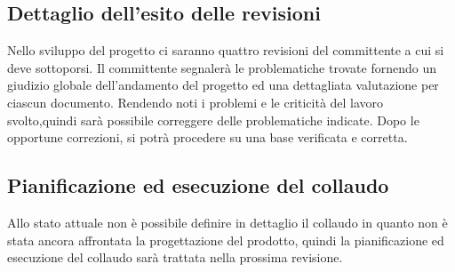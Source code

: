 \documentclass[12pt,a4paper]{article}
\begin{document}
\subsection{Dettaglio dell'esito delle revisioni}
Nello sviluppo del progetto ci saranno quattro revisioni del committente a cui si deve sottoporsi. Il committente segnalerà le problematiche trovate fornendo un giudizio globale dell'andamento del progetto ed una dettagliata valutazione per ciascun documento. Rendendo noti i problemi e le criticità del lavoro svolto,quindi sarà possibile correggere delle problematiche indicate. Dopo le opportune correzioni, si potrà procedere su una base verificata e corretta.
\newpage
\subsection{Pianificazione ed esecuzione del collaudo}
Allo stato attuale non è possibile definire in dettaglio il collaudo in quanto non è stata ancora affrontata la
progettazione del prodotto, quindi la pianificazione ed esecuzione del collaudo sarà trattata nella prossima revisione.
\end{document}
